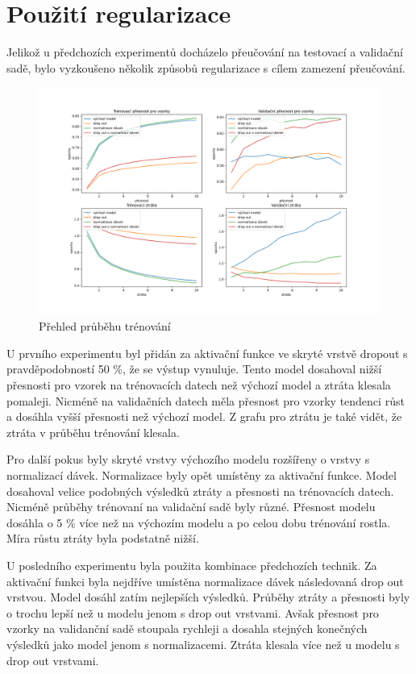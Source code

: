 \documentclass[FM,BP]{tulthesis}
\begin{document}
\section{Použití regularizace}
Jelikož u předchozích experimentů docházelo přeučování na testovací a validační sadě, bylo vyzkoušeno několik způsobů regularizace s cílem zamezení přeučování.

\begin{figure}[!htbp]
\centerline{\includegraphics[scale=.5]{training_course-regularization.png}}
\caption{Přehled průběhu trénování}
\label{fig}
\end{figure}
\FloatBarrier

U prvního experimentu byl přidán za aktivační funkce ve skryté vrstvě dropout s pravděpodobností 50 \%, že se výstup vynuluje. Tento model dosahoval nižší přesnosti pro vzorek na trénovacích datech než výchozí model a ztráta klesala pomaleji. Nicméně na validačních datech měla přesnost pro vzorky tendenci růst a dosáhla vyšší přesnosti než výchozí model. Z grafu pro ztrátu je také vidět, že ztráta v průběhu trénování klesala. 

Pro další pokus byly skryté vrstvy výchozího modelu rozšířeny o vrstvy s normalizací dávek. Normalizace byly opět umístěny za aktivační funkce. Model dosahoval velice podobných výsledků ztráty a přesnosti na trénovacích datech. Nicméně průběhy trénovaní na validační sadě byly různé. Přesnost modelu dosáhla o 5 \% více než na výchozím modelu a po celou dobu trénování rostla. Míra růstu ztráty byla podstatně nižší. 

U posledního experimentu byla použita kombinace předchozích technik. Za aktivační funkci byla nejdříve umístěna normalizace dávek následovaná drop out vrstvou. Model dosáhl zatím nejlepších výsledků. Průběhy ztráty a přesnosti byly o trochu lepší než u modelu jenom s drop out vrstvami. Avšak přesnost pro vzorky na validanční sadě stoupala rychleji a dosahla stejných konečných výsledků jako model jenom s normalizacemi. Ztráta klesala více než u modelu s drop out vrstvami.
\end{document}
